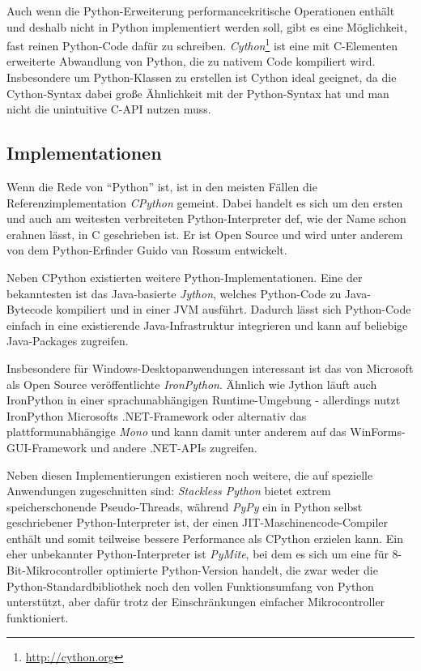 

Auch wenn die Python-Erweiterung performancekritische Operationen enthält und deshalb nicht in
Python implementiert werden soll, gibt es eine Möglichkeit, fast reinen Python-Code dafür zu
schreiben. \emph{Cython}\footnote{\href{http://cython.org}{http://cython.org}} ist eine mit
C-Elementen erweiterte Abwandlung von Python, die zu nativem Code kompiliert wird. Insbesondere um
Python-Klassen zu erstellen ist Cython ideal geeignet, da die Cython-Syntax dabei große Ähnlichkeit
mit der Python-Syntax hat und man nicht die unintuitive C-API nutzen muss.


\subsection{Implementationen}

Wenn die Rede von \enquote{Python} ist, ist in den meisten Fällen die Referenzimplementation
\emph{CPython} gemeint. Dabei handelt es sich um den ersten und auch am weitesten verbreiteten
Python-Interpreter def, wie der Name schon erahnen lässt, in C geschrieben ist. Er ist Open Source
und wird unter anderem von dem Python-Erfinder Guido van Rossum entwickelt.

Neben CPython existierten weitere Python-Implementationen. Eine der bekanntesten ist das
Java-basierte \emph{Jython}, welches Python-Code zu Java-Bytecode kompiliert und in einer JVM
ausführt. Dadurch lässt sich Python-Code einfach in eine existierende Java-Infrastruktur integrieren
und kann auf beliebige Java-Packages zugreifen.

Insbesondere für Windows-Desktopanwendungen interessant ist das von Microsoft als Open Source
veröffentlichte \emph{IronPython}. Ähnlich wie Jython läuft auch IronPython in einer
sprachunabhängigen Runtime-Umgebung - allerdings nutzt IronPython Microsofts .NET-Framework oder
alternativ das plattformunabhängige \emph{Mono} und kann damit unter anderem auf das
WinForms-GUI-Framework und andere .NET-APIs zugreifen.

Neben diesen Implementierungen existieren noch weitere, die auf spezielle Anwendungen zugeschnitten
sind: \emph{Stackless Python} bietet extrem speicherschonende Pseudo-Threads, während \emph{PyPy}
ein in Python selbst geschriebener Python-Interpreter ist, der einen
JIT-Maschinencode-Compiler enthält und somit teilweise bessere Performance als CPython erzielen
kann. Ein eher unbekannter Python-Interpreter ist \emph{PyMite}, bei dem es sich um eine für
8-Bit-Mikrocontroller optimierte Python-Version handelt, die zwar weder die
Python-Standardbibliothek noch den vollen Funktionsumfang von Python unterstützt, aber dafür trotz
der Einschränkungen einfacher Mikrocontroller funktioniert.


